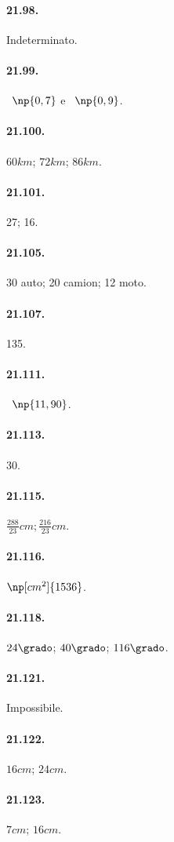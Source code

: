 \begin{multicols}{2}
\paragraph{21.98.} Indeterminato.

\paragraph{21.99.} \officialeuro~$\np{0,7}$ e \officialeuro~$\np{0,9}$.

\paragraph{21.100.} $60\unit{km}$; $72\unit{km}$; $86\unit{km}$.

\paragraph{21.101.} 27; 16.

\paragraph{21.105.} 30 auto; 20 camion; 12 moto.

\paragraph{21.107.} 135.

\paragraph{21.111.} \officialeuro~$\np{11,90}$.

\paragraph{21.113.} 30.

\paragraph{21.115.} $\frac{288}{23}\unit{cm};\frac{216}{23}\unit{cm}$.

\paragraph{21.116.} $\np[cm^2]{1536}$.

\paragraph{21.118.} $24\grado$; $40\grado$; $116\grado$.

\paragraph{21.121.} Impossibile.

\paragraph{21.122.} $16\unit{cm}$; $24\unit{cm}$.

\paragraph{21.123.} $7\unit{cm}$; $16\unit{cm}$.
\end{multicols}

